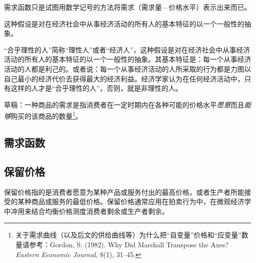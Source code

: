 需求函数只是试图用数学记号的方法将需求（需求量—价格水平）表示出来而已。

这种假设是对在经济社会中从事经济活动的所有人的基本特征的以一个一般性的抽象。

“合乎理性的人”简称“理性人”或者“经济人”，这种假设是对在经济社会中从事经济活动的所有人的基本特征的以一个一般性的抽象。其基本特征是：每一个从事经济活动的人都是利己的。或者说：每一个从事经济活动的人所采取的行为都是力图以自己最小的经济代价去获得最大的经济利益。经济学家认为在任何经济活动中，只有这样的人才是“合乎理性的人”，否则，就是非理性的人。

草稿：一种商品的需求是指消费者在一定时期内在各种可能的价格水平{\itshape 愿意}而且{\itshape 能够}购买的该商品的数量\footnote{%
关于需求曲线（以及后文的供给曲线等）为什么把“自变量”价格和“应变量”数量请参考：Gordon, S. (1982). Why Did Marshall Transpose the Axes? {\it Eastern Economic Journal}, 8(1), 31--45.}。

\subsection{需求函数}

\subsection{保留价格}
\label{subsec:reservation-price}

保留价格指的是消费者愿意为某种产品或服务付出的最高价格，或者生产者所能接受的某种商品或服务的最低价格。保留价格通常应用在拍卖行为中，在微观经济学中冲用来结合均衡价格测度消费者剩余或生产者剩余。

